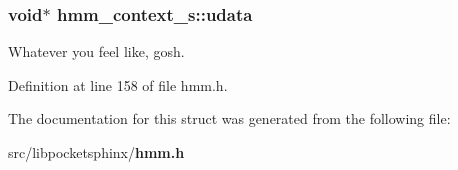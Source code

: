 \subsubsection[{udata}]{\setlength{\rightskip}{0pt plus 5cm}void$\ast$ {\bf hmm\-\_\-context\-\_\-s\-::udata}}\label{structhmm__context__s_a1f80af93746230d41b4ee7e89786a4c7}


\-Whatever you feel like, gosh. 



\-Definition at line 158 of file hmm.\-h.



\-The documentation for this struct was generated from the following file\-:\begin{DoxyCompactItemize}
\item 
src/libpocketsphinx/{\bf hmm.\-h}\end{DoxyCompactItemize}
